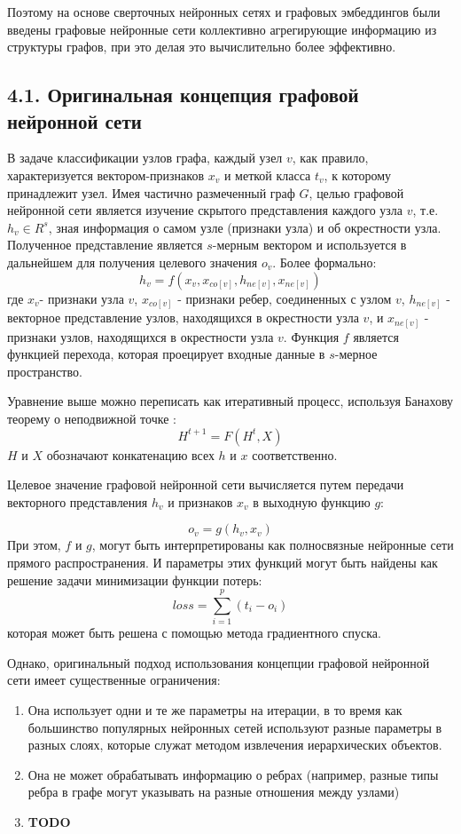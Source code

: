 Поэтому на основе сверточных нейронных сетях и графовых эмбеддингов были введены графовые нейронные сети коллективно агрегирующие информацию из структуры графов, при это делая это вычислительно более эффективно.

\subsection{4.1. Оригинальная концепция графовой нейронной сети}

В задаче классификации узлов графа, каждый узел $v$, как правило, характеризуется вектором-признаков $x_v$ и меткой класса $t_v$, к которому принадлежит узел. Имея частично размеченный граф $G$,
целью графовой нейронной сети является изучение скрытого представления каждого узла $v$, т.е. $h_v \in R^s$, зная информация о самом узле (признаки узла) и об окрестности узла. Полученное представление является $s$-мерным вектором и используется в дальнейшем для получения целевого значения $o_v$.  Более формально:
$$
h_v = f(x_v, x_{co[v]}, h_{ne[v]}, x_{ne[v]}) 
$$
где $x_v$- признаки узла $v$, $x_{co[v]}$ - признаки ребер, соединенных с узлом $v$, $h_{ne[v]}$ - векторное представление узлов, находящихся в окрестности узла $v$, и $x_{ne[v]}$ - признаки узлов, находящихся в окрестности узла $v$.  Функция $f$ является функцией перехода, которая проецирует входные данные в $s$-мерное пространство. 

Уравнение выше можно переписать как итеративный процесс, используя Банахову теорему о неподвижной точке \cite{fixed-point theorem}:
$$
H^{t+1} = F(H^t, X)
$$
$H$ и $X$ обозначают конкатенацию всех $h$ и $x$ соответственно.

Целевое значение графовой нейронной сети вычисляется путем передачи векторного представления $h_v$ и признаков $x_v$ в выходную функцию $g$:

$$
o_v = g(h_v, x_v)
$$
При этом, $f$ и $g$, могут быть интерпретированы как полносвязные нейронные сети прямого распространения. И параметры этих функций могут быть найдены как решение задачи минимизации функции потерь:
$$
	loss = \sum_{i=1}^p (t_i - o_i)
$$
которая может быть решена с помощью метода градиентного спуска.

Однако, оригинальный подход использования концепции графовой нейронной сети имеет существенные ограничения:
\begin{enumerate}
\item Она использует одни и те же параметры на итерации, в то время как большинство популярных нейронных сетей используют разные параметры в разных слоях, которые служат методом извлечения иерархических объектов. 
\item Она не может обрабатывать информацию о ребрах (например, разные типы ребра в графе могут указывать на разные отношения между узлами)
\item \textbf{TODO}
\end{enumerate}

